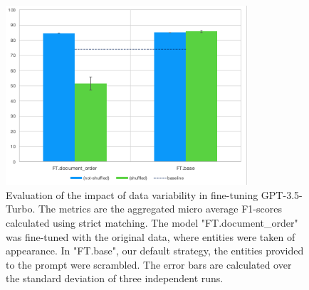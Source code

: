 \begin{figure}[htbp]
  \centering
  \includegraphics[width=0.8\textwidth]{figures/re-eval-ft.png} 
  \caption{Evaluation of the impact of data variability in fine-tuning GPT-3.5-Turbo. The metrics are the aggregated micro average F1-scores calculated using strict matching. The model "FT.document\_order" was fine-tuned with the original data, where entities were taken of appearance. In "FT.base", our default strategy, the entities provided to the prompt were scrambled. The error bars are calculated over the standard deviation of three independent runs.}
  \label{fig:re-eval-ft}
\end{figure}

\clearpage

\appendix
\label{appendix}


